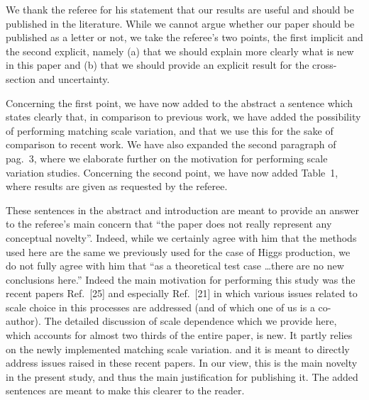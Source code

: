 \documentclass[12pt]{article}
\begin{document}
We thank the referee for his statement that our results are useful and
should be published in the literature. While we cannot argue whether
our paper should be published as a letter or not, we take the
referee's two points, the first implicit and the second explicit, 
namely (a) that we should explain more clearly
what is new  in this paper and (b) that we should provide an explicit result
for the cross-section and uncertainty.


Concerning the first point, we have now added to the abstract a sentence
which states clearly that, in comparison to previous work, we have added the
possibility of performing 
matching scale variation, and that we use this for the sake of
comparison to recent work. We have also expanded the second paragraph
of pag.~3, where we elaborate further on the motivation for performing
scale variation studies. Concerning the second point, we have now added
Table~1, where results are given as requested by the referee.

These sentences in the abstract and introduction are meant to provide
an answer to  the referee's main concern that ``the paper does
not really represent any conceptual novelty''. Indeed, while we certainly agree
with him that the methods used  here are the same we previously used
for the case of Higgs production, we do not fully agree with him that
``as a theoretical test case \dots there are no new conclusions
here.'' Indeed the main motivation for performing this study was the
recent papers Ref.~[25] and especially Ref.~[21] in which various
issues related to scale choice in this processes are addressed (and of
which one of us is a co-author). The detailed discussion of scale
dependence which we provide here, which accounts for almost two
thirds of the entire paper, is new. It partly relies on the newly
implemented matching scale variation. and it is meant to directly
address issues raised in these recent papers. In our view, this is the
main novelty in the present study, and thus the main justification for
publishing it. The added sentences are meant to make this clearer to
the reader.
\end{document}
